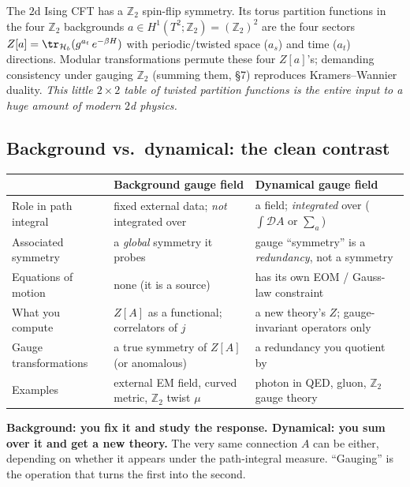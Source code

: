 \documentclass[11pt]{article}
\newcommand{\Ztwo}{\mathbb{Z}_2}
\begin{document}
\begin{eexample}
The $2$d Ising CFT has a $\Ztwo$ spin-flip symmetry. Its torus partition functions in
the four $\Ztwo$ backgrounds $a\in H^1(T^2;\Ztwo)=(\Ztwo)^2$ are the four sectors
$Z[a] = \tr_{\mathcal H_b}(g^{a_t}\,e^{-\beta H})$ with periodic/twisted space
($a_s$) and time ($a_t$) directions. Modular transformations permute these four
$Z[a]$'s; demanding consistency under gauging $\Ztwo$ (summing them, \S7) reproduces
Kramers--Wannier duality. \emph{This little $2\times2$ table of twisted partition
functions is the entire input to a huge amount of modern $2$d physics.}
\end{eexample}

\subsection{Background vs.\ dynamical: the clean contrast}

\begin{center}
\renewcommand{\arraystretch}{1.35}
\begin{tabular}{p{}|p{}|p{}}
 & \textbf{Background gauge field} & \textbf{Dynamical gauge field}\\\hline
Role in path integral & fixed external data; \emph{not} integrated over & a field; \emph{integrated} over ($\int\mathcal D A$ or $\sum_a$)\\
Associated symmetry & a \emph{global} symmetry it probes & gauge ``symmetry'' is a \emph{redundancy}, not a symmetry\\
Equations of motion & none (it is a source) & has its own EOM / Gauss-law constraint\\
What you compute & $Z[A]$ as a functional; correlators of $j$ & a new theory's $Z$; gauge-invariant operators only\\
Gauge transformations & a true symmetry of $Z[A]$ (or anomalous) & a redundancy you quotient by\\
Examples & external EM field, curved metric, $\Ztwo$ twist $\mu$ & photon in QED, gluon, $\Ztwo$ gauge theory\\
\end{tabular}
\end{center}

\begin{nnote}
\textbf{Background: you fix it and study the response. Dynamical: you sum over it and
get a new theory.} The very same connection $A$ can be either, depending on whether it
appears under the path-integral measure. ``Gauging'' is the operation that turns the
first into the second.
\end{nnote}
\end{document}
